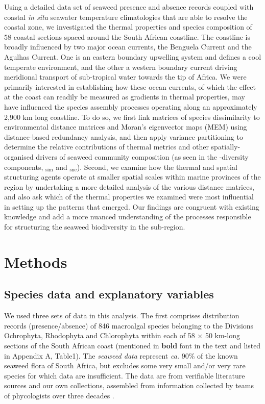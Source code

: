 \documentclass[utf8]{frontiersSCNS} %
\begin{document}
Using a detailed data set of seaweed presence and absence records coupled with coastal \emph{in situ} seawater temperature climatologies that are able to resolve the coastal zone, we investigated the thermal properties and species composition of 58 coastal sections spaced around the South African coastline. The coastline is broadly influenced by two major ocean currents, the Benguela Current and the Agulhas Current. One is an eastern boundary upwelling system and defines a cool temperate environment, and the other a western boundary current driving meridional transport of sub-tropical water towards the tip of Africa. We were primarily interested in establishing how these ocean currents, of which the effect at the coast can readily be measured as gradients in thermal properties, may have influenced the species assembly processes operating along an approximately 2,900 km long coastline. To do so, we first link matrices of species dissimilarity to environmental distance matrices and Moran's eigenvector maps (MEM) using distance-based redundancy analysis, and then apply variance partitioning \citep{PeresNeto2010} to determine the relative contributions of thermal metrics and other spatially-organised drivers of seaweed community composition (as seen in the \textbeta-diversity components, \textbeta$_{\text{sim}}$ and \textbeta$_{\text{sne}}$). Second, we examine how the thermal and spatial structuring agents operate at smaller spatial scales within marine provinces of the region by undertaking a more detailed analysis of the various distance matrices, and also ask which of the thermal properties we examined were most influential in setting up the patterns that emerged. Our findings are congruent with existing knowledge \citep[\emph{e.g.}][]{Stephenson1948,Lombard2004,Spalding2007} and add a more nuanced understanding of the processes responsible for structuring the seaweed biodiversity in the sub-region.

\section{Methods}

\subsection{Species data and explanatory variables}

We used three sets of data in this analysis. The first comprises distribution records (presence/absence) of 846 macroalgal species belonging to the Divisions Ochrophyta, Rhodophyta and Chlorophyta within each of 58 × 50 km-long sections of the South African coast (mentioned in \textbf{bold} font in the text and listed in Appendix A, Table1). The \emph{seaweed data} represent \emph{ca.} 90\% of the known seaweed flora of South Africa, but excludes some very small and/or very rare species for which data are insufficient. The data are from verifiable literature sources and our own collections, assembled from information collected by teams of phycologists over three decades \citep{Bolton2002,Bolton1996,Bolton1986,DeClerck2005,Stegenga1997}.
\end{document}
